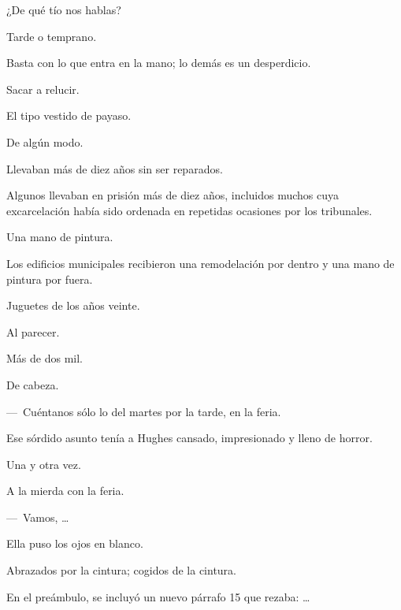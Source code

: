 \sk
¿De qué tío nos hablas? 

\sk
Tarde o temprano. 

\sk
Basta con lo que entra en la mano; lo demás es un desperdicio. 

\sk
Sacar a relucir. 

\sk
El tipo vestido de payaso. \nb{}

\sk
De algún modo. 

\sk
Llevaban más de diez años sin ser reparados. 

\sk
Algunos llevaban en prisión más de diez años, incluidos muchos cuya excarcelación había sido ordenada en repetidas ocasiones por los tribunales.

\sk
Una mano de pintura. 

\sk
Los edificios municipales recibieron una remodelación por dentro y una mano de pintura por fuera. \nb{}

\sk
Juguetes de los años veinte. 

\sk
Al parecer. 

\sk
Más de dos mil. 

\sk
De cabeza. 

\sk
---~Cuéntanos sólo lo del martes por la tarde, en la feria. 

\sk
Ese sórdido asunto tenía a Hughes cansado, impresionado y lleno de horror. 

\sk
Una y otra vez. 

\sk
A la mierda con la feria. 

\sk
---~Vamos, \ldots{} 

\sk
Ella puso los ojos en blanco. 

\sk
Abrazados por la cintura; cogidos de la cintura. 

\sk
En el preámbulo, se incluyó un nuevo párrafo 15 que rezaba: \ldots{} 

